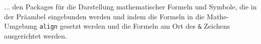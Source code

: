 
... den Packages für die Darstellung mathematischer Formeln und Symbole, die in der Präambel eingebunden werden und indem die Formeln in die Mathe-Umgebung \texttt{align} gesetzt werden und die Formeln am Ort des \texttt{\&} Zeichens ausgerichtet werden. 
